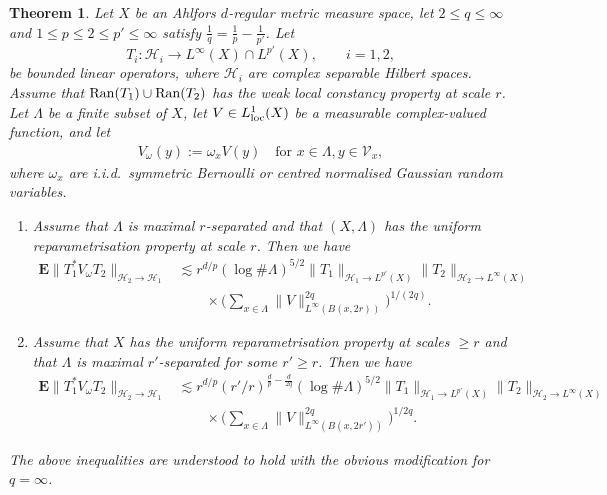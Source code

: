 \documentclass[12pt,reqno]{amsart}
\newtheorem{theorem}{Theorem}[section]
\theoremstyle{definition}
\theoremstyle{remark}
\numberwithin{equation}{section}
\newcommand{\1}{\mathbbm{1}}
\newcommand{\Ran}{\mathop{\rm Ran}}
\begin{document}
\begin{theorem}\label{thm:abstract2}
Let $X$ be an Ahlfors $d$-regular metric measure space, let $2\leq q\leq\infty$ and $1\leq p\leq 2\leq p'\leq \infty$ satisfy $\frac{1}{q}=\frac{1}{p}-\frac{1}{p'}$. Let
\[
T_i:\mathcal{H}_i\to L^\infty(X)\cap L^{p'}(X), \qquad i=1,2,
\]
be bounded linear operators, where $\mathcal{H}_i$ are complex separable Hilbert spaces. Assume that $\Ran(T_1)\cup\Ran (T_2)$ has the weak local constancy property at scale $r$.
  Let $\Lambda$ be a finite subset of $X$, let $V\in L^{1}_{\rm loc}(X)$ be a measurable complex-valued function, and let
  \begin{align}
  \label{eq:defrandomisation}
    V_{\omega}(y):=\omega_xV(y)\quad\mbox{for } x\in \Lambda,y\in \mathcal{V}_x,
  \end{align}
  where $\omega_x$ are i.i.d.~symmetric Bernoulli or centred normalised Gaussian random variables. 
  \begin{enumerate}
      \item Assume that $\Lambda$ is maximal $r$-separated and that $(X,\Lambda)$ has the uniform re\-pa\-ra\-me\-tri\-sa\-tion property at scale $r$. Then we have
  \begin{align*}
\mathbf{E}\|T_1^*V_{\omega}T_2\|_{\mathcal{H}_2\to \mathcal{H}_1}
    &\lesssim r^{d/p} (\log\#\Lambda)^{5/2}\|T_1\|_{\mathcal{H}_1\to L^{p'}(X)}\|T_2\|_{\mathcal{H}_2\to L^{\infty}(X)}\\
    &\qquad \times\Big(\sum_{x\in\Lambda}\|V\|_{L^{\infty}(B(x,2r))}^{2q}\Big)^{1/(2q)}.
  \end{align*}    
  \item Assume that $X$ has the uniform reparametrisation property at scales $\geq r$ and that $\Lambda$ is maximal $r'$-separated for some $r'\geq r$. Then we have
  \begin{align*}
\mathbf{E}\|T_1^*V_{\omega}T_2\|_{\mathcal{H}_2\to \mathcal{H}_1}
    &\lesssim r^{d/p} (r'/r)^{\frac{d}{p}-\frac{d}{2q}}(\log\#\Lambda)^{5/2}\|T_1\|_{\mathcal{H}_1\to L^{p'}(X)}\|T_2\|_{\mathcal{H}_2\to L^{\infty}(X)}\\
    &\qquad \times\Big(\sum_{x\in \Lambda}\|V\|_{L^{\infty}(B(x,2r'))}^{2q}\Big)^{1/2q}.
  \end{align*}    
   \end{enumerate}
 The above inequalities are understood to hold with the obvious modification for $q=\infty$.
\end{theorem}
\end{document}

